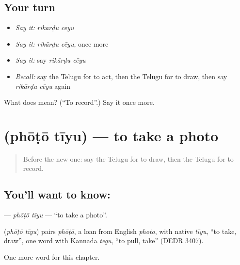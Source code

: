 \subsection*{Your turn}
\begin{itemize}
\raggedright
  \item \emph{Say it:} \emph{rikārḍu cēyu}
  \item \emph{Say it:} \emph{rikārḍu cēyu}, once more
  \item \emph{Say it:} say \emph{rikārḍu cēyu}
  \item \emph{Recall:} say the Telugu for to act, then the Telugu for to draw, then say \emph{rikārḍu cēyu} again
\end{itemize}

\begin{tcolorbox}[breakable,colback=teal!4,colframe=teal!35!black,title={Before you move on}]
What does   mean? (\textquotedblleft{}To record\textquotedblright{}.) Say it once more.
\end{tcolorbox}
\section[\texorpdfstring{\te{ఫోటో} \te{తీయు} (phōṭō tīyu)}{ఫోటో తీయు (phōṭō tīyu)}]{  (phōṭō tīyu) — to take a photo}

\label{lesson:TE-C205-photo-tiyu}



\begin{quote}
Before the new one: say the Telugu for to draw, then the Telugu for to record.
\end{quote}

\subsection*{You'll want to know:  }
\textbf{ } — \emph{phōṭō tīyu} — \textquotedblleft{}to take a photo\textquotedblright{}.

\begin{cousinweb}
\textbf{ } (\emph{phōṭō tīyu}) pairs \emph{phōṭō}, a loan from English \emph{photo}, with native \emph{tīyu}, \textquotedblleft{}to take, draw\textquotedblright{}, one word with Kannada \emph{tegu}, \textquotedblleft{}to pull, take\textquotedblright{} (DEDR 3407).
\end{cousinweb}

\begin{grammarlens}[title={What you've built}]
One more word for this chapter.
\end{grammarlens}

